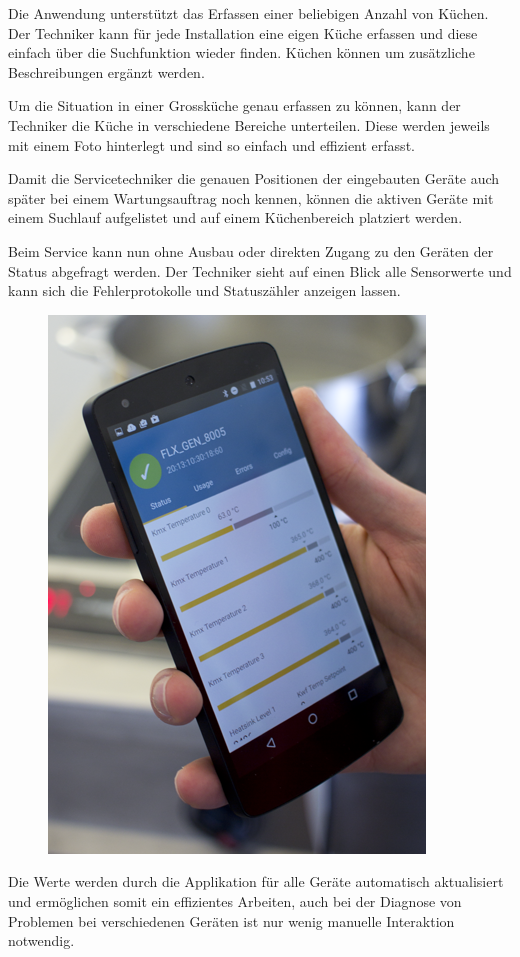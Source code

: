 Die Anwendung unterstützt das Erfassen einer beliebigen Anzahl von Küchen. Der Techniker kann für jede Installation eine eigen Küche erfassen und diese einfach über die Suchfunktion wieder finden. Küchen können um zusätzliche Beschreibungen ergänzt werden.

Um die Situation in einer Grossküche genau erfassen zu können, kann der Techniker die Küche in verschiedene Bereiche unterteilen. Diese werden jeweils mit einem Foto hinterlegt und sind so einfach und effizient erfasst.

Damit die Servicetechniker die genauen Positionen der eingebauten Geräte auch später bei einem Wartungsauftrag noch kennen, können die aktiven Geräte mit einem Suchlauf aufgelistet und auf einem Küchenbereich platziert werden.
\WFclear

Beim Service kann nun ohne Ausbau oder direkten Zugang zu den Geräten der Status abgefragt werden. Der Techniker sieht auf einen Blick alle Sensorwerte und kann sich die Fehlerprotokolle und Statuszähler anzeigen lassen.\\
\begin{figure}
	\vspace{-.5cm}
	\begin{center}
		\includegraphics[scale=1]{start/img/img_7610}
	\end{center}
	\vspace{-1cm}
\end{figure}
Die Werte werden durch die Applikation für alle Geräte automatisch aktualisiert und ermöglichen somit ein effizientes Arbeiten, auch bei der Diagnose von Problemen bei verschiedenen Geräten ist nur wenig manuelle Interaktion notwendig.

